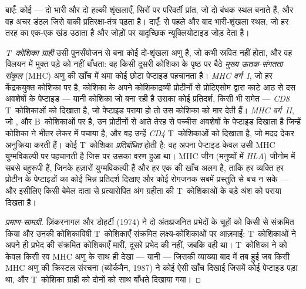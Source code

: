 \begin{omfigure}
{\small बाएँ: कोई  --- दो भारी और दो हल्की शृंखलाएँ, सिरों पर
परिवर्ती प्रांत, जो दो बंधक स्थल बनाते हैं, और वह अचर डंठल जिसे बाकी
प्रतिरक्षा-तंत्र पढ़ता है। दाएँ:  से पहले और बाद
भारी-शृंखला स्थल, जो हर तरह का एक-एक खंड उठाता है और जोड़ों पर
यादृच्छिक न्यूक्लियोटाइड जोड़ देता है।}
\end{omfigure}

\begin{definition}[T~कोशिका ग्राही और MHC]\label{def:b3:adaptive-immunity:mhc}
\emph{T~कोशिका ग्राही} उसी पुनर्संयोजन से बना कोई दो-शृंखला अणु है, जो
कभी स्रवित नहीं होता, और वह विलयन में मुक्त पड़े  को नहीं
बाँधता: वह किसी दूसरी कोशिका के पृष्ठ पर बैठे \emph{मुख्य ऊतक-संगतता
संकुल} (MHC) अणु की खाँच में थमा कोई छोटा पेप्टाइड पहचानता है।
\emph{MHC वर्ग~I}, जो हर केंद्रकयुक्त कोशिका पर है, कोशिका के अपने
कोशिकाद्रव्यी प्रोटीनों से प्रोटिएसोम द्वारा काटे आठ से दस अवशेषों के
पेप्टाइड --- यानी कोशिका जो बना रही है उसका कोई प्रतिदर्श, किसी भी
 समेत --- \emph{CD8} T~कोशिकाओं को दिखाता है, जो पेप्टाइड पराया
हो तो उस कोशिका को मार देती हैं। \emph{MHC वर्ग~II}, जो ,  और B~कोशिकाओं पर है, उन प्रोटीनों से आते तेरह से
पच्चीस अवशेषों के पेप्टाइड दिखाता है जिन्हें कोशिका ने भीतर लेकर
 में पचाया है, और वह उन्हें \emph{CD4} T~कोशिकाओं को दिखाता
है, जो मदद देकर अनुक्रिया करती हैं। कोई T~कोशिका \emph{प्रतिबंधित}
होती है: वह अपना पेप्टाइड केवल उसी MHC युग्मविकल्पी पर पहचानती है
जिस पर उसका वरण हुआ था। MHC जीन (मनुष्यों में \emph{HLA}) जीनोम में
सबसे बहुरूपी हैं, जिनके हज़ारों युग्मविकल्पी हैं और हर एक की खाँच अलग
है, ताकि हर व्यक्ति हर प्रोटीन के पेप्टाइडों का कोई भिन्न प्रतिदर्श
दिखाए और कोई रोगजनक सबमें प्रस्तुति से बच न सके --- और इसीलिए किसी
बेमेल दाता से प्रत्यारोपित अंग ग्रहीता की T~कोशिकाओं के बड़े अंश को
पराया दिखता है।
\end{definition}

\begin{proof}[प्रमाण-सामग्री]
ज़िंकरनागल और डोहर्टी (1974) ने दो अंतःप्रजनित प्रभेदों के चूहों को किसी
 से संक्रमित किया और उनकी कोशिकाविषी T~कोशिकाएँ संक्रमित
लक्ष्य-कोशिकाओं पर आज़माईं: T~कोशिकाओं ने अपने ही प्रभेद की संक्रमित
कोशिकाएँ मारीं, दूसरे प्रभेद की नहीं, जबकि  वही था। T~कोशिका ने
 को केवल किसी स्व MHC अणु के साथ ही देखा --- यानी
\emph{} --- जिसकी व्याख्या बाद में तब हुई जब किसी MHC अणु
की क्रिस्टल संरचना (ब्योर्कमैन, 1987) ने कोई ऐसी खाँच दिखाई जिसमें कोई
पेप्टाइड पड़ा था, और T~कोशिका ग्राही को दोनों को साथ बाँधते दिखाया गया।
\end{proof}

